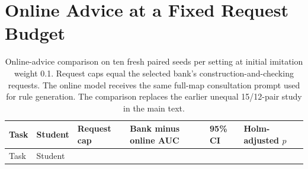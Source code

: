 \section{Online Advice at a Fixed Request
Budget}\label{online-advice-at-a-fixed-request-budget}

\begin{longtable}[]{@{}
  >{\raggedright\arraybackslash}p{}
  >{\raggedright\arraybackslash}p{}
  >{\raggedleft\arraybackslash}p{}
  >{\raggedleft\arraybackslash}p{}
  >{\raggedright\arraybackslash}p{}
  >{\raggedleft\arraybackslash}p{}@{}}
\caption{Online-advice comparison on ten fresh paired seeds per setting
at initial imitation weight 0.1. Request caps equal the selected bank's
construction-and-checking requests. The online model receives the same
full-map consultation prompt used for rule generation. The comparison
replaces the earlier unequal 15/12-pair study in the main
text.}\tabularnewline
\toprule\noalign{}
\begin{minipage}[b]{\linewidth}\raggedright
Task
\end{minipage} & \begin{minipage}[b]{\linewidth}\raggedright
Student
\end{minipage} & \begin{minipage}[b]{\linewidth}\raggedleft
Request cap
\end{minipage} & \begin{minipage}[b]{\linewidth}\raggedleft
Bank minus online AUC
\end{minipage} & \begin{minipage}[b]{\linewidth}\raggedright
95\% CI
\end{minipage} & \begin{minipage}[b]{\linewidth}\raggedleft
Holm-adjusted \(p\)
\end{minipage} \\
\midrule\noalign{}
\endfirsthead
\toprule\noalign{}
\begin{minipage}[b]{\linewidth}\raggedright
Task
\end{minipage} & \begin{minipage}[b]{\linewidth}\raggedright
Student
\end{minipage} & \begin{minipage}[b]{\linewidth}\raggedleft

\end{minipage}
\end{longtable}
